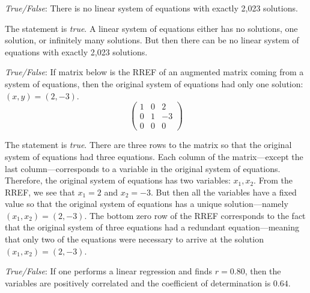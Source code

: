 \documentclass[11pt,letterpaper]{article}
\begin{document}
\quizsol \textit{True/False}: There is no linear system of equations with exactly 2,023 solutions. \pspace

\sol The statement is \textit{true}. A linear system of equations either has no solutions, one solution, or infinitely many solutions. But then there can be no linear system of equations with exactly 2,023 solutions. \pvspace{1.3cm}



\quizsol \textit{True/False}: If matrix below is the RREF of an augmented matrix coming from a system of equations, then the original system of equations had only one solution: $(x, y)= (2, -3)$.
	\[
	\begin{pmatrix}
	1 & 0 & 2 \\
	0 & 1 & -3 \\
	0 & 0 & 0 
	\end{pmatrix}
	\] \pspace

\sol The statement is \textit{true}. There are three rows to the matrix so that the original system of equations had three equations. Each column of the matrix---except the last column---corresponds to a variable in the original system of equations. Therefore, the original system of equations has two variables: $x_1, x_2$. From the RREF, we see that $x_1= 2$ and $x_2= -3$. But then all the variables have a fixed value so that the original system of equations has a unique solution---namely $(x_1, x_2)= (2, -3)$. The bottom zero row of the RREF corresponds to the fact that the original system of three equations had a redundant equation---meaning that only two of the equations were necessary to arrive at the solution $(x_1, x_2)= (2, -3)$. \pvspace{1.3cm}



\quizsol \textit{True/False}: If one performs a linear regression and finds $r= 0.80$, then the variables are positively correlated and the coefficient of determination is $0.64$. \pspace

\sol 




\end{document}
